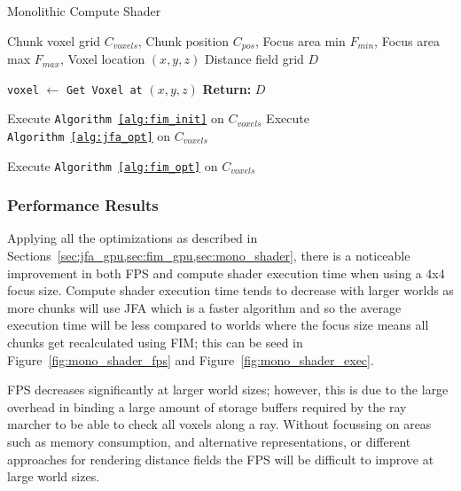 \begin{algorithm}[H]
    \caption{Monolithic Compute Shader}
    \label{alg:mono_shader}
    \begin{algorithmic}[1]
        \REQUIRE Chunk voxel grid \(C_{voxels}\), Chunk position \(C_{pos}\),
        Focus area min \(F_{min}\), Focus area max \(F_{max}\), Voxel location \((x, y, z)\)
        \ENSURE Distance field grid \(D\)

        \STATE \texttt{voxel} $\gets$ \texttt{Get Voxel at} \((x, y, z)\)
        \STATE \textbf{Return:} \(D\)
        \ENDIF

        \STATE Execute \texttt{Algorithm~\ref{alg:fim_init}} on $C_{voxels}$
        \STATE Execute \texttt{Algorithm~\ref{alg:jfa_opt}} on $C_{voxels}$

        \STATE Execute \texttt{Algorithm~\ref{alg:fim_opt}} on $C_{voxels}$
        \ENDIF
    \end{algorithmic}
\end{algorithm}

\subsubsection{Performance Results}
Applying all the optimizations as described in Sections~\cref{sec:jfa_gpu,sec:fim_gpu,sec:mono_shader}, there is a
noticeable improvement in both FPS and compute shader execution time when using a 4x4 focus size. Compute shader
execution time tends to decrease with larger worlds as more chunks will use JFA which is a faster algorithm and so the
average execution time will be less compared to worlds where the focus size means all chunks get recalculated using FIM;
this can be seed in Figure~\ref{fig:mono_shader_fps} and Figure~\ref{fig:mono_shader_exec}.

FPS decreases significantly at larger world sizes; however, this is due to the large overhead in binding a large amount
of storage buffers required by the ray marcher to be able to check all voxels along a ray. Without focussing on areas
such as memory consumption, and alternative representations, or different approaches for rendering distance fields the
FPS will be difficult to improve at large world sizes.


